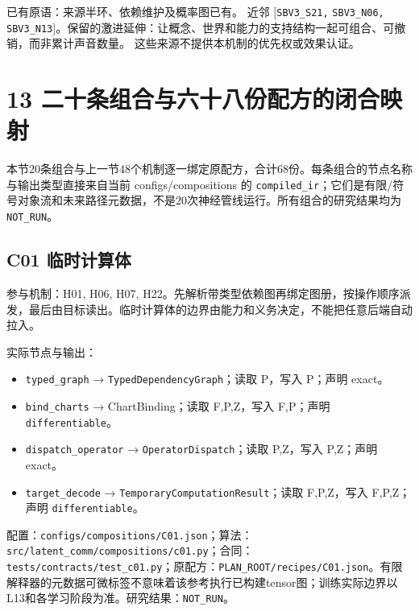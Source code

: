 \documentclass[
  10pt,
]{article}
\begin{document}
已有原语：来源半环、依赖维护及概率图已有。 近邻 {[}\nolinkurl{SBV3_S21,}
\nolinkurl{SBV3_N06,}
\nolinkurl{SBV3_N13}{]}。保留的激进延伸：让概念、世界和能力的支持结构一起可组合、可撤销，而非累计声音数量。
这些来源不提供本机制的优先权或效果认证。

\section{13
二十条组合与六十八份配方的闭合映射}\label{ux4e8cux5341ux6761ux7ec4ux5408ux4e0eux516dux5341ux516bux4efdux914dux65b9ux7684ux95edux5408ux6620ux5c04}

本节20条组合与上一节48个机制逐一绑定原配方，合计68份。每条组合的节点名称与输出类型直接来自当前
configs/compositions 的
\nolinkurl{compiled_ir}；它们是有限/符号对象流和未来路径元数据，不是20次神经管线运行。所有组合的研究结果均为
\nolinkurl{NOT_RUN}。

\subsection{C01 临时计算体}\label{c01-ux4e34ux65f6ux8ba1ux7b97ux4f53}

参与机制：H01, H06, H07,
H22。先解析带类型依赖图再绑定图册，按操作顺序派发，最后由目标读出。临时计算体的边界由能力和义务决定，不能把任意后端自动拉入。

实际节点与输出：

\begin{itemize}
\item
  \nolinkurl{typed_graph} → \nolinkurl{TypedDependencyGraph}；读取
  P，写入 P；声明 exact。
\item
  \nolinkurl{bind_charts} → ChartBinding；读取 F,P,Z，写入 F,P；声明
  \nolinkurl{differentiable}。
\item
  \nolinkurl{dispatch_operator} → \nolinkurl{OperatorDispatch}；读取
  P,Z，写入 P,Z；声明 exact。
\item
  \nolinkurl{target_decode} →
  \nolinkurl{TemporaryComputationResult}；读取 F,P,Z，写入 F,P,Z；声明
  \nolinkurl{differentiable}。
\end{itemize}

配置：{\small\nolinkurl{configs/compositions/C01.json}}；算法：{\small\nolinkurl{src/latent_comm/compositions/c01.py}}；合同：{\small\nolinkurl{tests/contracts/test_c01.py}}；原配方：{\small\nolinkurl{PLAN_ROOT/recipes/C01.json}}。有限解释器的元数据可微标签不意味着该参考执行已构建tensor图；训练实际边界以L13和各学习阶段为准。研究结果：\nolinkurl{NOT_RUN}。
\end{document}
